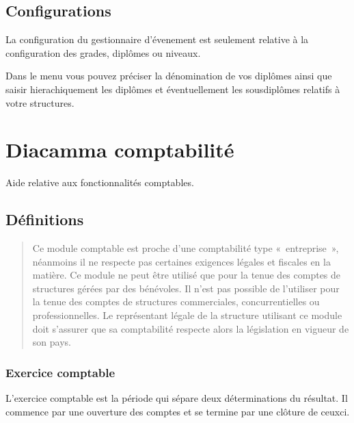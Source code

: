 \documentclass[a4paper,10pt,oneside,french]{sphinxmanual}
\begin{document}
\section{Configurations}
\label{\detokenize{event/config:configurations}}\label{\detokenize{event/config::doc}}
La configuration du gestionnaire d’évenement est seulement relative à la configuration des grades, diplômes ou niveaux.

Dans le menu  vous pouvez préciser la dénomination de vos diplômes
ainsi que saisir hierachiquement les diplômes et éventuellement les sous\sphinxhyphen{}diplômes relatifs à votre structures.


\chapter{Diacamma comptabilité}
\label{\detokenize{accounting/index:diacamma-comptabilite}}\label{\detokenize{accounting/index::doc}}
Aide relative aux fonctionnalités comptables.


\section{Définitions}
\label{\detokenize{accounting/definition:definitions}}\label{\detokenize{accounting/definition::doc}}\begin{quote}

 Ce module comptable est proche d’une comptabilité type « entreprise », néanmoins il ne respecte pas certaines exigences légales et fiscales en la matière.
Ce module ne peut être utilisé que pour la tenue des comptes de structures gérées par des bénévoles. Il n’est pas possible de l’utiliser pour la tenue des comptes de structures commerciales, concurrentielles ou professionnelles.
Le représentant légale de la structure utilisant ce module doit s’assurer que sa comptabilité respecte alors la législation en vigueur de son pays.
\end{quote}


\subsection{Exercice comptable}
\label{\detokenize{accounting/definition:exercice-comptable}}
L’exercice comptable est la période qui sépare deux déterminations du résultat. Il commence par une ouverture des comptes et se termine par une clôture de ceux\sphinxhyphen{}ci.
\end{document}

